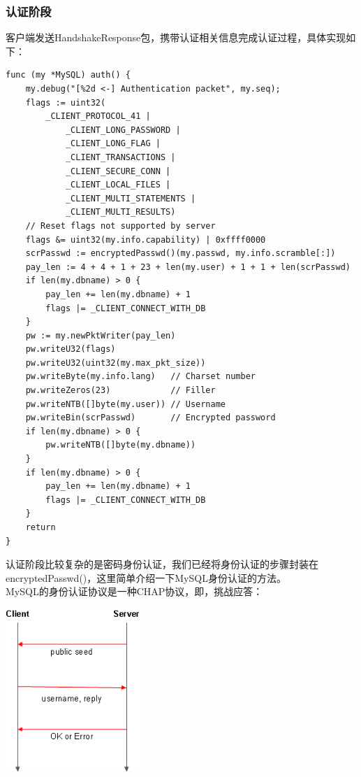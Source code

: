 \documentclass[a4paper, titlepage, 10pt, bookmark]{article}
\begin{document}
\subsubsection{认证阶段}
客户端发送HandshakeResponse包，携带认证相关信息完成认证过程，具体实现如下：
\begin{spacing}{1.0}
\begin{lstlisting}
func (my *MySQL) auth() {
    my.debug("[%2d <-] Authentication packet", my.seq);
    flags := uint32(
        _CLIENT_PROTOCOL_41 |
            _CLIENT_LONG_PASSWORD |
            _CLIENT_LONG_FLAG |
            _CLIENT_TRANSACTIONS |
            _CLIENT_SECURE_CONN |
            _CLIENT_LOCAL_FILES |
            _CLIENT_MULTI_STATEMENTS |
            _CLIENT_MULTI_RESULTS)
    // Reset flags not supported by server
    flags &= uint32(my.info.capability) | 0xffff0000
    scrPasswd := encryptedPasswd()(my.passwd, my.info.scramble[:])
    pay_len := 4 + 4 + 1 + 23 + len(my.user) + 1 + 1 + len(scrPasswd)
    if len(my.dbname) > 0 {
        pay_len += len(my.dbname) + 1
        flags |= _CLIENT_CONNECT_WITH_DB
    }
    pw := my.newPktWriter(pay_len)
    pw.writeU32(flags)
    pw.writeU32(uint32(my.max_pkt_size))
    pw.writeByte(my.info.lang)   // Charset number
    pw.writeZeros(23)            // Filler
    pw.writeNTB([]byte(my.user)) // Username
    pw.writeBin(scrPasswd)       // Encrypted password
    if len(my.dbname) > 0 {
        pw.writeNTB([]byte(my.dbname))
    }
    if len(my.dbname) > 0 {
        pay_len += len(my.dbname) + 1
        flags |= _CLIENT_CONNECT_WITH_DB
    }
    return
}
\end{lstlisting}
\end{spacing}

认证阶段比较复杂的是密码身份认证，我们已经将身份认证的步骤封装在encryptedPasswd()，这里简单介绍一下MySQL身份认证的方法。\\

MySQL的身份认证协议是一种CHAP协议，即，挑战应答：
\begin{center}
\includegraphics[width=2in]{018.png}
\end{center}
\end{document}
